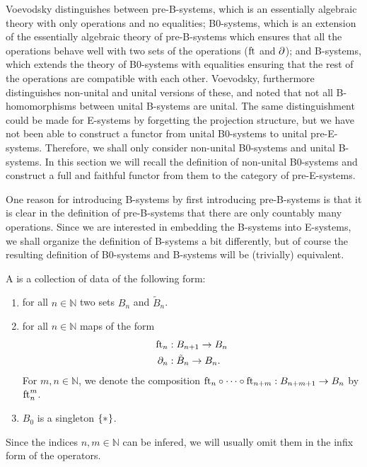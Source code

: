 Voevodsky distinguishes between pre-B-systems, which is an essentially algebraic theory with
only operations and no equalities; B0-systems, which is an extension of the
essentially algebraic theory of pre-B-systems which ensures that all the operations behave
well with two sets of the operations ($\eft$ and $\ebd$); and B-systems, which extends the 
theory of B0-systems with equalities ensuring that the rest of the operations 
are compatible with each other. Voevodsky, furthermore distinguishes
non-unital and unital versions of these, and noted that not all B-homomorphisms
between unital B-systems are unital. The same distinguishment could be made for 
E-systems by forgetting the projection structure, but we have not been able to construct a
functor from unital B0-systems to unital pre-E-systems. Therefore, we shall only
consider non-unital B0-systems and unital B-systems. In this section we will
recall the definition of non-unital B0-systems and construct a full and faithful
functor from them to the category of pre-E-systems. 

One reason for introducing B-systems by first introducing pre-B-systems is that
it is clear in the definition of pre-B-systems that there are only countably
many operations. Since we are interested in embedding the B-systems into E-systems,
we shall organize the definition of B-systems a bit differently, but of course
the resulting definition of B0-systems and B-systems will be (trivially) 
equivalent.

\begin{defn}
A  is a collection of data of the following form:
\begin{enumerate}
\item for all $n\in\mathbb{N}$ two sets $B_n$ and $\tilde{B}_n$. 
\item for all $n\in\mathbb{N}$ maps of the form
\begin{align*}
\eft[n] & : B_{n+1}\to B_n \\
\ebd[n] & : \tilde{B}_n\to B_n.
\end{align*}
For $m,n\in\mathbb{N}$, we denote the composition $\eft[n]\circ\cdots\circ\eft[n+m]:B_{n+m+1}\to B_n$ by $\eft[n]^m$. 
\item $B_0$ is a singleton $\{\pt\}$.
\end{enumerate} 
\end{defn}

\begin{rmk}
Since the indices $n,m\in\mathbb{N}$ can be infered, we will usually omit them
in the infix form of the operators.
\end{rmk}


